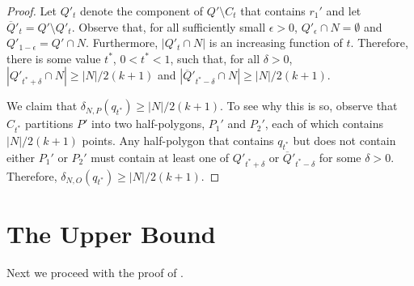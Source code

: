 \documentclass{article}
\begin{document}
\begin{proof}
Let $Q'_t$ denote the component of $Q'\setminus C_t$ that contains
$r_1'$ and let $\overline{Q}'_t = Q'\setminus Q'_t$.
Observe that, for all sufficiently small $\epsilon > 0$, $Q'_\epsilon\cap
N=\emptyset$ and $Q'_{1-\epsilon} = Q'\cap N$.  Furthermore, $|Q'_t\cap N|$
is an increasing function of $t$.
Therefore, there is some value $t^*$, $0 < t^* < 1$, such that, for
all $\delta > 0$, 
$|Q'_{t^*+\delta}\cap N|\ge |N|/2(k+1)$ and 
$|\overline{Q}'_{t^*-\delta}\cap N|\ge |N|/2(k+1)$.

We claim that $\delta_{N,P}(q_{t^*}) \ge |N|/2(k+1)$.   To see
why this is so, observe that $C_{t^*}$ partitions $P'$ into two
half-polygons, $P_1'$ and $P_2'$, each of which contains $|N|/2(k+1)$
points.  Any half-polygon that contains $q_{t^*}$ but does not contain
either $P_1'$ or $P_2'$ must contain at least one of 
$Q'_{t^*+\delta}$ or 
$\overline{Q}'_{t^*-\delta}$ for some $\delta > 0$.
Therefore, $\delta_{N,O}(q_{t^*}) \ge |N|/2(k+1)$.
\end{proof}

\section{The Upper Bound}

Next we proceed with the proof of .
\end{document}
